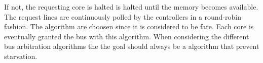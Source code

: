 




 If not, the requesting core is halted is halted until the memory becomes available.
The request lines are continuously polled by the controllers in a round-robin fashion. The algorithm are choosen since it is considered to be fare. Each core is eventually granted the bus with this algorithm. When considering the different bus arbitration algorithms the the goal should always be a algorithm that prevent starvation.  


\section{}
